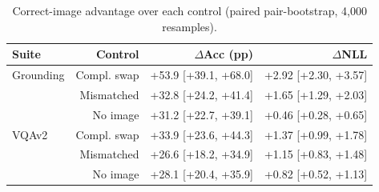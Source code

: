 \begin{table}[t]
\centering
\small
\begin{tabular}{lrrr}
\toprule
Suite & Control & $\Delta$Acc (pp) & $\Delta$NLL \\
\midrule
Grounding & Compl. swap & +53.9 [+39.1, +68.0] & +2.92 [+2.30, +3.57] \\
 & Mismatched & +32.8 [+24.2, +41.4] & +1.65 [+1.29, +2.03] \\
 & No image & +31.2 [+22.7, +39.1] & +0.46 [+0.28, +0.65] \\
VQAv2 & Compl. swap & +33.9 [+23.6, +44.3] & +1.37 [+0.99, +1.78] \\
 & Mismatched & +26.6 [+18.2, +34.9] & +1.15 [+0.83, +1.48] \\
 & No image & +28.1 [+20.4, +35.9] & +0.82 [+0.52, +1.13] \\
\bottomrule
\end{tabular}
\caption{Correct-image advantage over each control (paired pair-bootstrap, 4,000 resamples).}
\label{tab:t2-adv}
\end{table}
